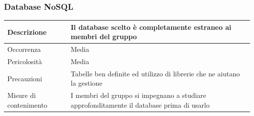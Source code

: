 \documentclass{article}
\begin{document}
\subsubsection{Database NoSQL}
\begin{center}
\begin{tabular}{|P{10em}| P{20em}|}
\hline
     Descrizione & Il database scelto è completamente estraneo ai membri del gruppo\\ 
     \hline
    Occorrenza & Media\\
    \hline
    Pericolosità & Media \\
    \hline
    Precauzioni & Tabelle ben definite ed utilizzo di librerie che ne aiutano la gestione\\
    \hline
    Misure di contenimento & I membri del gruppo si impegnano a studiare approfonditamente il database prima di usarlo\\
    \hline
\end{tabular}
\label{tab:esptec}
\end{center}
\end{document}
